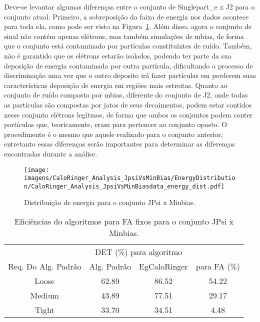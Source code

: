 Deve-se levantar algumas diferenças entre o conjunto de Singlepart\_e x J2 para
o conjunto atual. Primeiro, a sobreposição da faixa de energia nos dados
acontece para toda ela, como pode ser visto na
Figura~\ref{fig:jpsixminb_dist_energia}. Além disso, agora o conjunto de sinal
não contém apenas elétrons, mas também simulações de \gls{mbias}, de forma que o
conjunto está contaminado por partículas constituíntes de ruído. Também, não é
garantido que os elétrons estarão isolados, podendo ter parte da sua deposição
de energia contaminada por outra partícula, dificultando o processo de
discriminação uma vez que o outro deposito irá fazer partículas \gls{em}
perderem suas características deposição de energia em regiões mais estreitas.
Quanto ao conjunto de ruído composto por \gls{mbias}, diferente do conjunto de
J2, onde todas as partículas são compostas por jatos de seus decaimentos, podem
estar contidos nesse conjunto elétrons legítmos, de forma que ambos os conjuntos
podem conter partículas que, teoricamente, eram para pertencer ao conjunto
oposto. O procedimento é o mesmo que aquele realizado para o conjunto anterior, entretanto
essas diferenças serão importantes para determinar as diferenças encontradas
durante a análise.

\begin{figure}[ht]
\centering
\texttt{[image: imagens/CaloRinger\_Analysis\_JpsiVsMinBias/EnergyDistribution/CaloRinger\_Analysis\_JpsiVsMinBiasdata\_energy\_dist.pdf]}
\caption{Distribuição de energia para o conjunto JPsi x Minbias.}
\label{fig:jpsixminb_dist_energia}
\end{figure}

\begin{table}[htb]
\centering
\begin{tabular}{cccc}
\hline
\hline
 & 
\multicolumn{2}{c}{DET (\%) para algoritmo} & 
\\
\cline{2-3}
\multirow{-2}{*}{Req. Do Alg. Padrão} & 
Alg. Padrão & 
EgCaloRinger & 
\multirow{-2}{*}{para FA (\%)} \\
\hline
Loose  & 62.89 & 86.52 & 54.22\\
Medium & 43.89 & 77.51 & 29.17\\
Tight  & 33.70 & 34.51 & 4.48 \\
\hline
\hline
\end{tabular}
\caption{Eficiências do algoritmos para FA fixos para o conjunto JPsi x Minbias.}
\label{tab:jpsixminb_efic}
\end{table}


